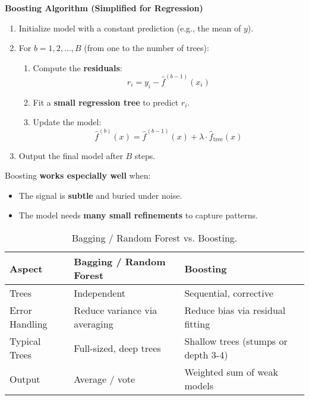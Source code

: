 \newpage

\begin{flushleft}
    \textcolor{Green3}{ \textbf{Boosting Algorithm (Simplified for Regression)}}
\end{flushleft}
\begin{enumerate}
    \item Initialize model with a constant prediction (e.g., the mean of $y$).
    \item For $b = 1, 2, ..., B$ (from one to the number of trees):
    \begin{enumerate}
        \item Compute the \textbf{residuals}:
        \begin{equation*}
            r_i = y_i - \hat{f}^{(b-1)}(x_i)
        \end{equation*}
        \item Fit a \textbf{small regression tree} to predict $r_i$.
        \item Update the model:
        \begin{equation*}
            \hat{f}^{(b)}(x) = \hat{f}^{(b-1)}(x) + \lambda \cdot \hat{f}_{\text{tree}}(x)
        \end{equation*}
    \end{enumerate}
    \item Output the final model after $B$ steps.
\end{enumerate}
Boosting \textbf{works especially well} when:
\begin{itemize}[label=\textcolor{Green3}{}]
    \item The signal is \textbf{subtle} and buried under noise.
    \item The model needs \textbf{many small refinements} to capture patterns.
\end{itemize}

\begin{table}[!htp]
    \centering
    \begin{adjustbox}{width={\textwidth},totalheight={\textheight},keepaspectratio}
        \begin{tabular}{@{} l l l @{}}
            \toprule
            Aspect & Bagging / Random Forest & Boosting \\
            \midrule
            Trees           & Independent                   & Sequential, corrective                \\ [.3em]
            Error Handling  & Reduce variance via averaging & Reduce bias via residual fitting      \\ [.3em]
            Typical Trees   & Full-sized, deep trees        & Shallow trees (stumps or depth 3-4)   \\ [.3em]
            Output          & Average / vote                & Weighted sum of weak models           \\
            \bottomrule
        \end{tabular}
    \end{adjustbox}
    \caption{Bagging / Random Forest vs. Boosting.}
\end{table}

